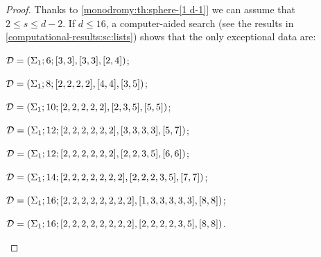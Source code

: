 \begin{proof}
Thanks to \cref{monodromy:th:sphere-[1 d-1]} we can assume that $2\le s\le d-2$. If $d\le 16$, a computer-aided search (see the results in \cref{computational-results:sc:lists}) shows that the only exceptional data	 are:
\begin{enumarabic}
\item $\mathcal{D}=(\Sigma_{1};6;[3, 3],[3, 3],[2, 4])$;
\item $\mathcal{D}=(\Sigma_{1};8;[2, 2, 2, 2],[4, 4],[3, 5])$;
\item $\mathcal{D}=(\Sigma_{1};10;[2, 2, 2, 2, 2],[2, 3, 5],[5, 5])$;
\item $\mathcal{D}=(\Sigma_{1};12;[2, 2, 2, 2, 2, 2],[3, 3, 3, 3],[5, 7])$;
\item $\mathcal{D}=(\Sigma_{1};12;[2, 2, 2, 2, 2, 2],[2, 2, 3, 5],[6, 6])$;
\item $\mathcal{D}=(\Sigma_{1};14;[2, 2, 2, 2, 2, 2, 2],[2, 2, 2, 3, 5],[7, 7])$;
\item $\mathcal{D}=(\Sigma_{1};16;[2, 2, 2, 2, 2, 2, 2, 2],[1, 3, 3, 3, 3, 3],[8, 8])$;
\item $\mathcal{D}=(\Sigma_{1};16;[2, 2, 2, 2, 2, 2, 2, 2],[2, 2, 2, 2, 3, 5],[8, 8])$.


\end{enumarabic}
\end{proof}
